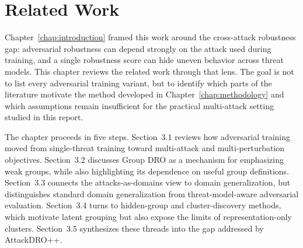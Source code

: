 \chapter{Related Work}
\label{chap:related_work}

Chapter~\ref{chap:introduction} framed this work around the cross-attack
robustness gap: adversarial robustness can depend strongly on the attack used
during training, and a single robustness score can hide uneven behavior across
threat models. This chapter reviews the related work through that lens. The
goal is not to list every adversarial training variant, but to identify which
parts of the literature motivate the method developed in
Chapter~\ref{chap:methodology} and which assumptions remain insufficient for
the practical multi-attack setting studied in this report.

The chapter proceeds in five steps. Section~3.1 reviews how adversarial
training moved from single-threat training toward multi-attack and
multi-perturbation objectives. Section~3.2 discusses Group DRO as a mechanism
for emphasizing weak groups, while also highlighting its dependence on useful
group definitions. Section~3.3 connects the attacks-as-domains view to domain
generalization, but distinguishes standard domain generalization from
threat-model-aware adversarial evaluation. Section~3.4 turns to hidden-group
and cluster-discovery methods, which motivate latent grouping but also expose
the limits of representation-only clusters. Section~3.5 synthesizes these
threads into the gap addressed by AttackDRO++.






